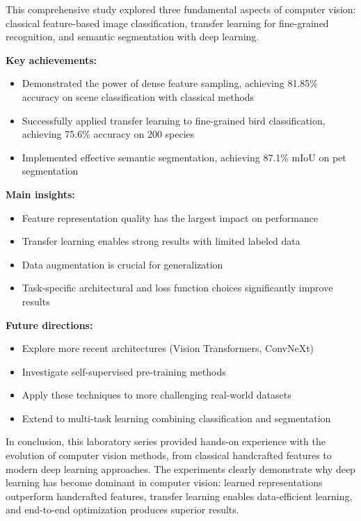 \documentclass[conference]{IEEEtran}
\begin{document}
This comprehensive study explored three fundamental aspects of computer vision: classical feature-based image classification, transfer learning for fine-grained recognition, and semantic segmentation with deep learning.

\textbf{Key achievements:}
\begin{itemize}
\item Demonstrated the power of dense feature sampling, achieving 81.85\% accuracy on scene classification with classical methods
\item Successfully applied transfer learning to fine-grained bird classification, achieving 75.6\% accuracy on 200 species
\item Implemented effective semantic segmentation, achieving 87.1\% mIoU on pet segmentation
\end{itemize}

\textbf{Main insights:}
\begin{itemize}
\item Feature representation quality has the largest impact on performance
\item Transfer learning enables strong results with limited labeled data
\item Data augmentation is crucial for generalization
\item Task-specific architectural and loss function choices significantly improve results
\end{itemize}

\textbf{Future directions:}
\begin{itemize}
\item Explore more recent architectures (Vision Transformers, ConvNeXt)
\item Investigate self-supervised pre-training methods
\item Apply these techniques to more challenging real-world datasets
\item Extend to multi-task learning combining classification and segmentation
\end{itemize}

In conclusion, this laboratory series provided hands-on experience with the evolution of computer vision methods, from classical handcrafted features to modern deep learning approaches. The experiments clearly demonstrate why deep learning has become dominant in computer vision: learned representations outperform handcrafted features, transfer learning enables data-efficient learning, and end-to-end optimization produces superior results.
\end{document}
